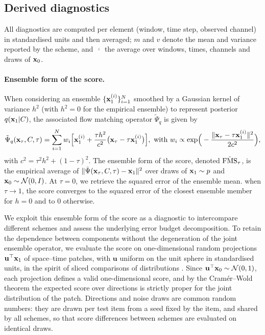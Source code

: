 \subsection{Derived diagnostics}
All diagnostics are computed per element (window, time step, observed channel) in
standardised units and then averaged; $m$ and $v$ denote the mean and variance
reported by the scheme, and $\overline{\,\cdot\,}$ the average over windows, times,
channels and draws of $\mathbf{x}_0$.

\paragraph{Ensemble form of the score.} When considering an ensemble $\{\mathbf{x}_1^{(i)}\}_{i=1}^N$ smoothed by a Gaussian kernel of variance $h^2$ (with $h^2 = 0$ for the empirical ensemble) to represent posterior $q(\mathbf{x}_1|C)$, the associated flow matching operator $\tilde\Psi_q$ is given by
\begin{equation}\label{eq:fms_mix}
  \tilde\Psi_q(\mathbf{x}_\tau,C,\tau) = \sum_{i=1}^N w_i\Big[\mathbf{x}_1^{(i)} + \frac{\tau h^2}{c^2}\big(\mathbf{x}_\tau - \tau\mathbf{x}_1^{(i)}\big)\Big],
  \mbox{ with } w_i \propto \exp\!\Big(-\frac{\|\mathbf{x}_\tau - \tau\mathbf{x}_1^{(i)}\|^2}{2c^2}\Big),
\end{equation}
with $c^2 = \tau^2 h^2 + (1-\tau)^2$.
The ensemble form of the score, denoted $\tilde {\mathrm{FMS}}_\tau$, is the empirical average of $\|\tilde \Psi(\mathbf{x}_\tau,C,\tau) - \mathbf{x}_1\|^2$ over draws of $\mathbf{x}_1\sim p$ and $\mathbf{x}_0 \sim \mathcal{N}(0, I)$. At $\tau=0$, we retrieve the squared error of the ensemble mean. when $\tau\rightarrow 1$, the score  converges to the squared error of the closest ensemble member  for $h=0$ and to 0 otherwise.

We exploit this ensemble form of the score as a diagnostic to intercompare different schemes and assess the underlying error budget decomposition. To retain the dependence between components without the degeneration of the joint ensemble operator, we evaluate the score on one-dimensional random projections $\mathbf{u}^\top\mathbf{x}_1$ of space–time patches, with $\mathbf{u}$ uniform on the unit sphere in standardised units, in the spirit of sliced comparisons of distributions \cite{rabin_wasserstein_2012,bonneel_sliced_2015}.
Since $\mathbf{u}^\top\mathbf{x}_0 \sim \mathcal{N}(0,1)$, each projection defines a valid one-dimensional score, and by the Cramér--Wold theorem \cite{cramer_theorems_1936} the expected score over directions is strictly proper for the joint distribution of the patch. Directions and noise draws are common random numbers: they are drawn per test item from a seed fixed by the item, and shared by all schemes, so that score differences between schemes are evaluated on identical draws.

